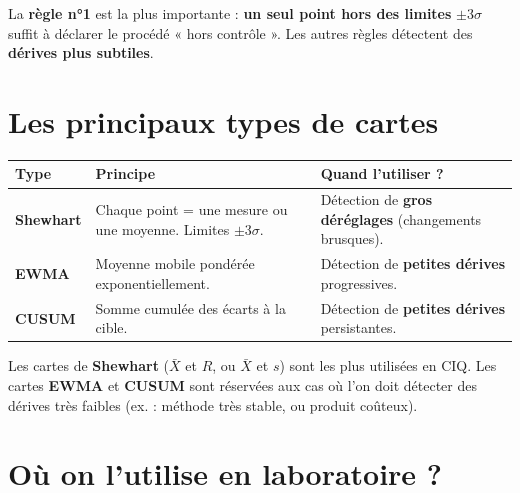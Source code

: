 \documentclass[11pt,a4paper]{article}
\begin{document}
\vspace{0.2cm}

\begin{attention}[title={\faExclamationTriangle\quad À retenir absolument}]
La \textbf{règle n°1} est la plus importante : \textbf{un seul point hors des limites} \(\pm 3\sigma\) suffit à déclarer le procédé « hors contrôle ». Les autres règles détectent des \textbf{dérives plus subtiles}.
\end{attention}

\section*{\faChartLine\quad Les principaux types de cartes}

\begin{center}
\renewcommand{\arraystretch}{1.4}
\begin{tabularx}{\linewidth}{|p{2.5cm}|X|p{4cm}|}
\hline
\rowcolor{soft}
\textbf{Type} & \textbf{Principe} & \textbf{Quand l'utiliser ?} \\ \hline
\textbf{Shewhart} & Chaque point = une mesure ou une moyenne. Limites \(\pm 3\sigma\). & Détection de \textbf{gros déréglages} (changements brusques). \\ \hline
\textbf{EWMA} & Moyenne mobile pondérée exponentiellement. & Détection de \textbf{petites dérives} progressives. \\ \hline
\textbf{CUSUM} & Somme cumulée des écarts à la cible. & Détection de \textbf{petites dérives} persistantes. \\ \hline
\end{tabularx}
\end{center}

\begin{labo}[title={\faFlask\quad En pratique au laboratoire}]
Les cartes de \textbf{Shewhart} (\(\bar{X}\) et \(R\), ou \(\bar{X}\) et \(s\)) sont les plus utilisées en CIQ. Les cartes \textbf{EWMA} et \textbf{CUSUM} sont réservées aux cas où l'on doit détecter des dérives très faibles (ex. : méthode très stable, ou produit coûteux).
\end{labo}

\section*{\faBuilding\quad Où on l'utilise en laboratoire ?}
\end{document}
